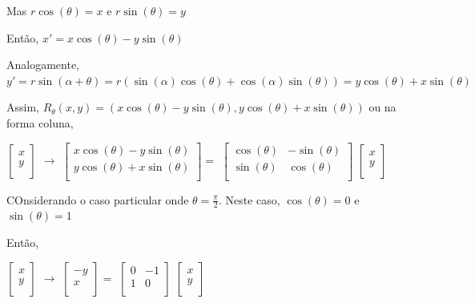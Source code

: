\documentclass[oneside,a4paper,12pt]{article}
\begin{document}
\begin{enumerate}
	Mas $r\cos(\theta) = x$ e $r\sin(\theta) = y$
	
	Então, $x' = x\cos(\theta) - y\sin(\theta)$
	
	Analogamente, $y' = r \sin(\alpha + \theta) = r(\sin(\alpha) \cos(\theta) + \cos(\alpha)\sin(\theta)) = y\cos(\theta) + x\sin(\theta)$
	
	Assim, $R_{\theta}(x,y) = (x\cos(\theta) - y\sin(\theta), y\cos(\theta) + x\sin(\theta))$ ou na forma coluna,
	
	$\left[
	\begin{array}{c}
	x\\
	y \\
	\end{array}
	\right]$ $\rightarrow$
	$\left[
	\begin{array}{c}
	x\cos(\theta) - y\sin(\theta)\\
	y\cos(\theta) + x\sin(\theta) \\
	\end{array}
	\right] = $
	$\left[
	\begin{array}{cc}
	\cos(\theta)	&	-\sin(\theta)\\
	\sin(\theta)	&	\cos(\theta) \\
	\end{array}
	\right]$
	$\left[
	\begin{array}{c}
	x\\
	y \\
	\end{array}
	\right]$
	
	COnsiderando o caso particular onde $\theta = \frac{\pi}{2}$. Neste caso, $\cos(\theta) = 0$ e $\sin(\theta) = 1$
	
	Então,
	
	$\left[
	\begin{array}{c}
	x\\
	y \\
	\end{array}
	\right]$ $\rightarrow$
	$\left[
	\begin{array}{c}
	-y	\\
	x	\\
	\end{array}
	\right] = $
	$\left[
	\begin{array}{cc}
	0	&	-1\\
	1	&	0 \\
	\end{array}
	\right]$
	$\left[
	\begin{array}{c}
	x\\
	y \\
	\end{array}
	\right]$
	

\end{enumerate}
\end{document}

